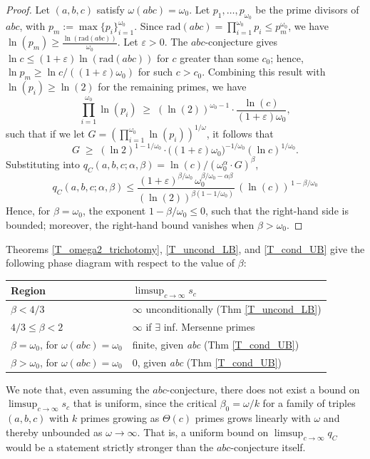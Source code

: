 \documentclass[11pt,letterpaper]{amsart}
\newcommand{\eps}{\varepsilon}
\def\ra{\rightarrow}
\def\eps{\varepsilon}
\begin{document}
\begin{proof} Let $(a, b, c)$ satisfy $\omega(abc) = \omega_0$. Let $p_1,\dots,p_{\omega_0}$ be the prime divisors of $abc$, with $p_{m} := \max \{p_i\}_{i = 1}^{\omega_0}$. Since $\mathrm{rad}(abc)=\prod_{i =1}^{\omega_0} p_i\le p_{m}^{\omega_0}$, we have $\ln(p_m) \ge \frac{\ln(\mathrm{rad}(abc))}{\omega_0}$.
Let $\eps > 0$. The $abc$-conjecture gives $\ln c\le(1+\varepsilon)\ln(\mathrm{rad}(abc))$ for $c$ greater than some $c_0$; hence, $\ln p_{m}\ge\ln c/((1+\varepsilon)\omega_0)$ for such $ c> c_0$. Combining this result with $\ln (p_i) \ge\ln (2)$ for the remaining primes, we have
\[
\textstyle\prod_{i = 1}^{\omega_0} \ln (p_i) \;\ge\;(\ln (2))^{\omega_0-1}\cdot\frac{\ln (c)}{(1+\varepsilon)\omega_0},
\]
such that if we let $G = \left(\textstyle\prod_{i = 1}^{\omega_0} \ln (p_i)  \right)^{1/\omega}$, it follows that
\[
G\;\ge\;(\ln 2)^{1-1/\omega_0}\cdot\bigl((1+\varepsilon)\omega_0\bigr)^{-1/\omega_0}(\ln c)^{1/\omega_0}.
\]
Substituting into $q_C(a, b, c; \alpha, \beta)=\ln (c)/(\omega_0^\alpha \cdot G)^\beta$,
\[
q_C(a, b, c; \alpha, \beta) \le \frac{(1+\varepsilon)^{\beta/\omega_0}\,\omega_0^{\beta/\omega_0-\alpha\beta}}{(\ln (2))^{\beta(1-1/\omega_0)}}\,(\ln (c))^{\,1-\beta/\omega_0}
\]
Hence, for $\beta = \omega_0$, the exponent $1 - \beta /\omega_0 \leq 0$, such that the right-hand side is bounded; moreover, the right-hand bound vanishes when $\beta > \omega_0$.
\end{proof}

Theorems \ref{T_omega2_trichotomy}, \ref{T_uncond_LB}, and \ref{T_cond_UB} give the following phase diagram with respect to the value of $\beta$:

\begin{center}\small
\begin{tabular}{|l|l|}
\hline
Region & $\limsup_{c \ra \infty} s_c$ \\
\hline
$\beta<4/3$ & $\infty$ unconditionally (Thm \ref{T_uncond_LB}) \\
$4/3\le\beta<2$ & $\infty$ if $\exists$ inf. Mersenne primes \\
$\beta= \omega_0$, for $\omega(abc)=\omega_0$ & finite, given \textit{abc} (Thm \ref{T_cond_UB})\\
$\beta>\omega_0$, for $\omega(abc)=\omega_0$ & $0$, given \textit{abc} (Thm \ref{T_cond_UB})\\
\hline
\end{tabular}
\end{center}

We note that, even assuming the $abc$-conjecture, there does not exist a bound on $\limsup_{c \ra \infty} s_c$ that is uniform, since the critical $\beta_0=\omega/k$ for a family of triples $(a, b, c)$ with $k$ primes growing as $\Theta(c)$ primes grows linearly with $\omega$ and thereby unbounded as $\omega \ra \infty$. That is, a uniform bound on $\limsup_{c \ra \infty} q_C$ would be a statement strictly stronger than the $abc$-conjecture itself. 
\end{document}
